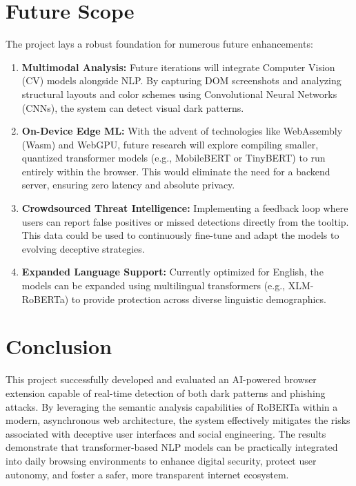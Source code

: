 \documentclass[12pt,a4paper]{report}
\begin{document}
\section{Future Scope}
The project lays a robust foundation for numerous future enhancements:
\begin{enumerate}
    \item \textbf{Multimodal Analysis:} Future iterations will integrate Computer Vision (CV) models alongside NLP. By capturing DOM screenshots and analyzing structural layouts and color schemes using Convolutional Neural Networks (CNNs), the system can detect visual dark patterns.
    \item \textbf{On-Device Edge ML:} With the advent of technologies like WebAssembly (Wasm) and WebGPU, future research will explore compiling smaller, quantized transformer models (e.g., MobileBERT or TinyBERT) to run entirely within the browser. This would eliminate the need for a backend server, ensuring zero latency and absolute privacy.
    \item \textbf{Crowdsourced Threat Intelligence:} Implementing a feedback loop where users can report false positives or missed detections directly from the tooltip. This data could be used to continuously fine-tune and adapt the models to evolving deceptive strategies.
    \item \textbf{Expanded Language Support:} Currently optimized for English, the models can be expanded using multilingual transformers (e.g., XLM-RoBERTa) to provide protection across diverse linguistic demographics.
\end{enumerate}

\section{Conclusion}
This project successfully developed and evaluated an AI-powered browser extension capable of real-time detection of both dark patterns and phishing attacks. By leveraging the semantic analysis capabilities of RoBERTa within a modern, asynchronous web architecture, the system effectively mitigates the risks associated with deceptive user interfaces and social engineering. The results demonstrate that transformer-based NLP models can be practically integrated into daily browsing environments to enhance digital security, protect user autonomy, and foster a safer, more transparent internet ecosystem.

\clearpage
{}
\end{document}
